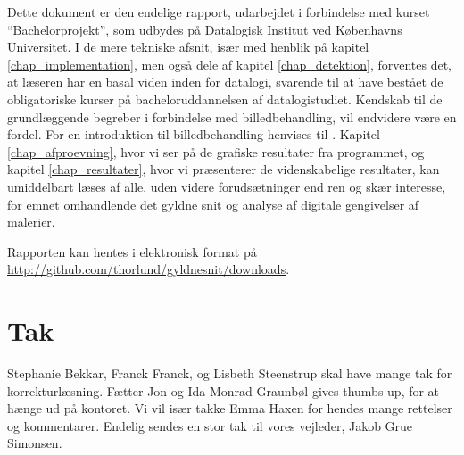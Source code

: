 {
{\sffamily Dette dokument er den endelige rapport, udarbejdet i
forbindelse med kurset ``Bachelorprojekt'', som udbydes på Datalogisk
Institut ved Københavns Universitet. I de mere tekniske afsnit, især med
henblik på kapitel \ref{chap_implementation}, men også dele af kapitel
\ref{chap_detektion}, forventes det, at læseren har en basal viden inden
for datalogi, svarende til at have bestået de obligatoriske kurser på
bacheloruddannelsen af datalogistudiet\cite{DIKUkurser}. Kendskab til de
grundlæggende begreber i forbindelse med billedbehandling, vil endvidere
være en fordel. For en introduktion til billedbehandling henvises til
\cite{SIOlsen}. Kapitel \ref{chap_afproevning}, hvor vi ser på de
grafiske resultater fra programmet, og kapitel \ref{chap_resultater},
hvor vi præsenterer de videnskabelige resultater, kan umiddelbart læses
af alle, uden videre forudsætninger end ren og skær interesse, for emnet
omhandlende det gyldne snit og analyse af digitale gengivelser af
malerier.

Rapporten kan hentes i elektronisk format på
\url{http://github.com/thorlund/gyldnesnit/downloads}.

\section*{Tak}
Stephanie Bekkar, Franck Franck, og Lisbeth Steenstrup skal have mange
tak for korrekturlæsning. Fætter Jon og Ida Monrad Graunbøl gives
thumbs-up, for at hænge ud på kontoret. Vi vil især takke Emma Haxen for
hendes mange rettelser og kommentarer. Endelig sendes en stor tak til
vores vejleder, Jakob Grue Simonsen.
}
}

